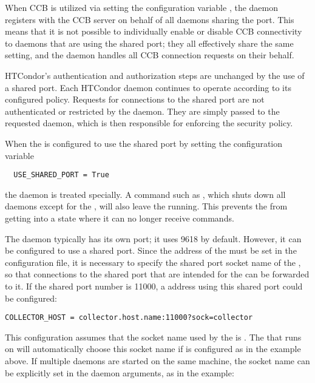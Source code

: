 When CCB is utilized via setting the configuration variable
,
the  daemon registers with
the CCB server on behalf of all daemons sharing the port.
This means that it is not possible to individually enable or disable
CCB connectivity to daemons that are using the shared port;
they all effectively share the same setting,
and the  daemon handles all CCB connection
requests on their behalf.

HTCondor's authentication and authorization steps are unchanged by the
use of a shared port.  Each HTCondor daemon continues to operate
according to its configured policy.  Requests for connections to the
shared port are not authenticated or restricted by
the  daemon.
They are simply passed to the requested daemon,
which is then responsible for enforcing the security policy.

When the  is configured to use the shared port
by setting the configuration variable
\begin{verbatim}
  USE_SHARED_PORT = True
\end{verbatim}
the  daemon is treated specially. 
A command such as ,
which shuts down all daemons except for the ,
will also leave the  running.
This prevents the  from getting into a state
where it can no longer receive commands.

The  daemon typically has its own port;
it uses 9618 by default.
However, it can be configured to use a shared port.
Since the address of the  must be set in 
the configuration file,
it is necessary to specify the shared port socket name of 
the ,
so that connections to the shared port that are intended for 
the  can be forwarded to it.
If the shared port number is 11000, a  address using this
shared port could be configured:

\footnotesize
\begin{verbatim}
COLLECTOR_HOST = collector.host.name:11000?sock=collector
\end{verbatim}
\normalsize

This configuration assumes that the socket name used by 
the  is .
The  that runs on 
will automatically choose this socket name if 
is configured as in the example above.
If multiple  daemons are started on the same
machine, the socket name can be explicitly set in the daemon arguments,
as in the example:

